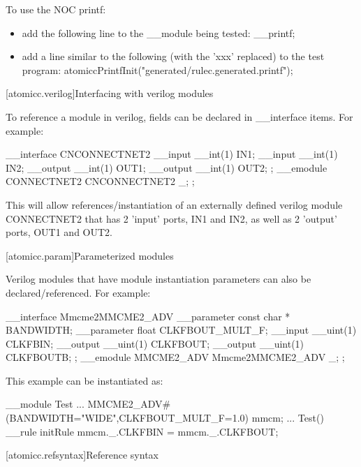 To use the NOC printf:
\begin{itemize}
\item add the following line to the __module being tested: __printf;
\item add a line similar to the following (with the 'xxx' replaced) to the test program:
           atomiccPrintfInit("generated/rulec.generated.printf");
\end{itemize}

[atomicc.verilog]{Interfacing with verilog modules}

To reference a module in verilog, fields can be declared in __interface items.
For example:

\begin{codeblock}
     __interface CNCONNECTNET2 {
         __input  __int(1)         IN1;
         __input  __int(1)         IN2;
         __output __int(1)         OUT1;
         __output __int(1)         OUT2;
     };
     __emodule CONNECTNET2 {
         CNCONNECTNET2 _;
     };
\end{codeblock}

This will allow references/instantiation of an externally defined verilog module CONNECTNET2
that has 2 'input' ports, IN1 and IN2, as well as 2 'output' ports, OUT1 and OUT2.

[atomicc.param]{Parameterized modules}

Verilog modules that have module instantiation parameters can also be declared/referenced.
For example:

\begin{codeblock}
     __interface Mmcme2MMCME2_ADV {
         __parameter const char *  BANDWIDTH;
         __parameter float         CLKFBOUT_MULT_F;
         __input  __uint(1)        CLKFBIN;
         __output __uint(1)        CLKFBOUT;
         __output __uint(1)        CLKFBOUTB;
     };
     __emodule MMCME2_ADV {
         Mmcme2MMCME2_ADV _;
     };
\end{codeblock}

This example can be instantiated as:

\begin{codeblock}
     __module Test {
         ...
         MMCME2_ADV#(BANDWIDTH="WIDE",CLKFBOUT_MULT_F=1.0) mmcm;
         ...
         Test() {
            __rule initRule {
                mmcm._.CLKFBIN = mmcm._.CLKFBOUT;
            }
         }
     }
\end{codeblock}

[atomicc.refsyntax]{Reference syntax}

